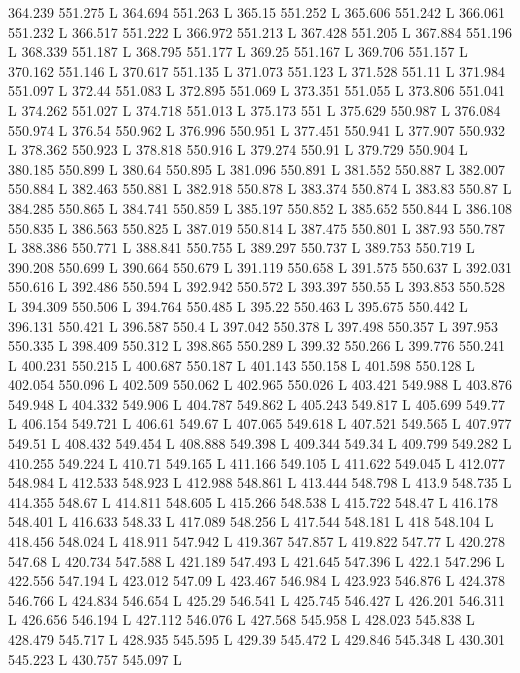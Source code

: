 364.239 551.275 L
364.694 551.263 L
365.15 551.252 L
365.606 551.242 L
366.061 551.232 L
366.517 551.222 L
366.972 551.213 L
367.428 551.205 L
367.884 551.196 L
368.339 551.187 L
368.795 551.177 L
369.25 551.167 L
369.706 551.157 L
370.162 551.146 L
370.617 551.135 L
371.073 551.123 L
371.528 551.11 L
371.984 551.097 L
372.44 551.083 L
372.895 551.069 L
373.351 551.055 L
373.806 551.041 L
374.262 551.027 L
374.718 551.013 L
375.173 551 L
375.629 550.987 L
376.084 550.974 L
376.54 550.962 L
376.996 550.951 L
377.451 550.941 L
377.907 550.932 L
378.362 550.923 L
378.818 550.916 L
379.274 550.91 L
379.729 550.904 L
380.185 550.899 L
380.64 550.895 L
381.096 550.891 L
381.552 550.887 L
382.007 550.884 L
382.463 550.881 L
382.918 550.878 L
383.374 550.874 L
383.83 550.87 L
384.285 550.865 L
384.741 550.859 L
385.197 550.852 L
385.652 550.844 L
386.108 550.835 L
386.563 550.825 L
387.019 550.814 L
387.475 550.801 L
387.93 550.787 L
388.386 550.771 L
388.841 550.755 L
389.297 550.737 L
389.753 550.719 L
390.208 550.699 L
390.664 550.679 L
391.119 550.658 L
391.575 550.637 L
392.031 550.616 L
392.486 550.594 L
392.942 550.572 L
393.397 550.55 L
393.853 550.528 L
394.309 550.506 L
394.764 550.485 L
395.22 550.463 L
395.675 550.442 L
396.131 550.421 L
396.587 550.4 L
397.042 550.378 L
397.498 550.357 L
397.953 550.335 L
398.409 550.312 L
398.865 550.289 L
399.32 550.266 L
399.776 550.241 L
400.231 550.215 L
400.687 550.187 L
401.143 550.158 L
401.598 550.128 L
402.054 550.096 L
402.509 550.062 L
402.965 550.026 L
403.421 549.988 L
403.876 549.948 L
404.332 549.906 L
404.787 549.862 L
405.243 549.817 L
405.699 549.77 L
406.154 549.721 L
406.61 549.67 L
407.065 549.618 L
407.521 549.565 L
407.977 549.51 L
408.432 549.454 L
408.888 549.398 L
409.344 549.34 L
409.799 549.282 L
410.255 549.224 L
410.71 549.165 L
411.166 549.105 L
411.622 549.045 L
412.077 548.984 L
412.533 548.923 L
412.988 548.861 L
413.444 548.798 L
413.9 548.735 L
414.355 548.67 L
414.811 548.605 L
415.266 548.538 L
415.722 548.47 L
416.178 548.401 L
416.633 548.33 L
417.089 548.256 L
417.544 548.181 L
418 548.104 L
418.456 548.024 L
418.911 547.942 L
419.367 547.857 L
419.822 547.77 L
420.278 547.68 L
420.734 547.588 L
421.189 547.493 L
421.645 547.396 L
422.1 547.296 L
422.556 547.194 L
423.012 547.09 L
423.467 546.984 L
423.923 546.876 L
424.378 546.766 L
424.834 546.654 L
425.29 546.541 L
425.745 546.427 L
426.201 546.311 L
426.656 546.194 L
427.112 546.076 L
427.568 545.958 L
428.023 545.838 L
428.479 545.717 L
428.935 545.595 L
429.39 545.472 L
429.846 545.348 L
430.301 545.223 L
430.757 545.097 L
